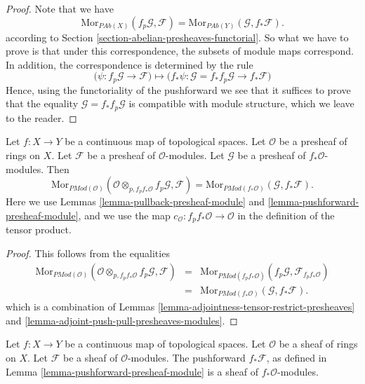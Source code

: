 \begin{proof}
Note that we have
$$
\text{Mor}_{\textit{PAb}(X)}(f_p\mathcal{G}, \mathcal{F})
=
\text{Mor}_{\textit{PAb}(Y)}(\mathcal{G}, f_*\mathcal{F}).
$$
according to Section \ref{section-abelian-presheaves-functorial}.
So what we have to prove is that under this correspondence, the
subsets of module maps correspond. In addition, the correspondence
is determined by the rule
$$
\Big(\psi : f_p\mathcal{G} \to \mathcal{F}\Big)
\longmapsto
\Big(f_*\psi : \mathcal{G} = f_* f_p \mathcal{G} \to f_* \mathcal{F}\Big)
$$
Hence, using the functoriality of the pushforward we see that
it suffices to prove that the equality $\mathcal{G} = f_* f_p \mathcal{G}$
is compatible with module structure, which we leave to the reader.
\end{proof}

\begin{lemma}
\label{lemma-adjoint-pull-push-presheaves-modules}
Let $f : X \to Y$ be a continuous map of topological spaces.
Let $\mathcal{O}$ be a presheaf of rings on $X$.
Let $\mathcal{F}$ be a presheaf of $\mathcal{O}$-modules.
Let $\mathcal{G}$ be a presheaf of $f_*\mathcal{O}$-modules.
Then
$$
\text{Mor}_{\textit{PMod}(\mathcal{O})}(
\mathcal{O} \otimes_{p, f_pf_*\mathcal{O}} f_p\mathcal{G}, \mathcal{F})
=
\text{Mor}_{\textit{PMod}(f_*\mathcal{O})}(\mathcal{G}, f_*\mathcal{F}).
$$
Here we use
Lemmas \ref{lemma-pullback-presheaf-module}
and \ref{lemma-pushforward-presheaf-module}, and we use
the map $c_{\mathcal{O}} : f_pf_*\mathcal{O} \to \mathcal{O}$
in the definition of the tensor product.
\end{lemma}

\begin{proof}
This follows from the equalities
\begin{eqnarray*}
\text{Mor}_{\textit{PMod}(\mathcal{O})}(
\mathcal{O} \otimes_{p, f_pf_*\mathcal{O}} f_p\mathcal{G}, \mathcal{F})
& = &
\text{Mor}_{\textit{PMod}(f_pf_*\mathcal{O})}(
f_p\mathcal{G}, \mathcal{F}_{f_pf_*\mathcal{O}}) \\
& = &
\text{Mor}_{\textit{PMod}(f_*\mathcal{O})}(\mathcal{G}, f_*\mathcal{F}).
\end{eqnarray*}
which is a combination of
Lemmas \ref{lemma-adjointness-tensor-restrict-presheaves}
and \ref{lemma-adjoint-push-pull-presheaves-modules}.
\end{proof}

\begin{lemma}
\label{lemma-pushforward-module}
Let $f : X \to Y$ be a continuous map of topological spaces.
Let $\mathcal{O}$ be a sheaf of rings on $X$. Let
$\mathcal{F}$ be a sheaf of $\mathcal{O}$-modules.
The pushforward $f_*\mathcal{F}$, as defined in
Lemma \ref{lemma-pushforward-presheaf-module}
is a sheaf of $f_*\mathcal{O}$-modules.
\end{lemma}

